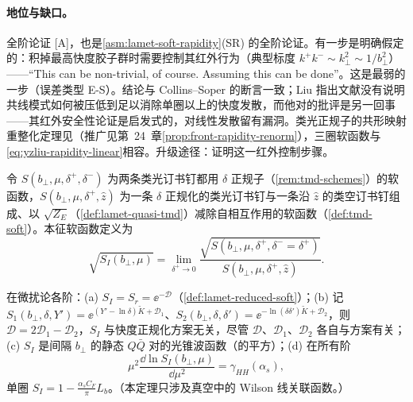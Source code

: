 \paragraph{地位与缺口。}全阶论证 [A]，也是\cref{asm:lamet-soft-rapidity}(SR) 的全阶论证。有一步是明确假定的：积掉最高快度胶子群时需要控制其红外行为（典型标度 $k^+k^-\sim k_\perp^2\sim1/b_\perp^2$）——“This can be non-trivial, of course. Assuming this can be done”\cite[附录~E]{Liu:2022nnk}。这是最弱的一步（误差类型 E-S）。结论与 Collins--Soper 的断言\cite{CollinsSoper1981}一致；Liu 指出文献\cite{Collins:2011ca}没有说明共线模式如何被压低到足以消除单圈以上的快度发散，而他对\cite{CollinsSoper1981}的批评是另一回事——其红外安全性论证是启发式的，对线性发散留有漏洞\cite[第~4.4~节、附录~D]{Liu:2022nnk}。类光正规子的共形映射重整化定理见\cite{Vladimirov:2017ksc}（推广见第~24~章\cref{prop:front-rapidity-renorm}），三圈软函数\cite{Li:2016axz}与\cref{eq:yzliu-rapidity-linear}相容。升级途径：证明这一红外控制步骤。

\begin{definition}[本征软函数的光锥定义]\label{def:yzliu-intrinsic-soft-lc}
令 $S(b_\perp,\mu,\delta^+,\delta^-)$ 为两条类光订书钉都用 $\delta$ 正规子（\cref{rem:tmd-schemes}）的软函数，$S(b_\perp,\mu,\delta^+,\hat z)$ 为一条 $\delta$ 正规化的类光订书钉与一条沿 $\hat z$ 的类空订书钉组成、以 $\sqrt{Z_E}$（\cref{def:lamet-quasi-tmd}）减除自相互作用的软函数（\cref{def:tmd-soft}）。本征软函数定义为\cite[式~(72)、(76)]{Liu:2022nnk} %
\begin{equation}\label{eq:yzliu-SI-lc}
\sqrt{S_I(b_\perp,\mu)}=\lim_{\delta^+\to0}\frac{\sqrt{S(b_\perp,\mu,\delta^+,\delta^-=\delta^+)}}{S(b_\perp,\mu,\delta^+,\hat z)} .
\end{equation}
\end{definition}

\begin{theorem}\label{thm:yzliu-intrinsic-soft}
在微扰论各阶：(a) $S_I=S_r=\ee^{-\mathcal D}$（\cref{def:lamet-reduced-soft}）；(b) 记 $S_1(b_\perp,\delta,Y')=\ee^{(Y'-\ln\delta)\tilde K+\mathcal D_1}$、$S_2(b_\perp,\delta,\delta')=\ee^{-\ln(\delta\delta')\tilde K+\mathcal D_2}$，则 $\mathcal D=2\mathcal D_1-\mathcal D_2$，$S_I$ 与快度正规化方案无关，尽管 $\mathcal D$、$\mathcal D_1$、$\mathcal D_2$ 各自与方案有关；(c) $S_I$ 是间隔 $b_\perp$ 的静态 $Q\bar Q$ 对的光锥波函数（的平方）；(d) 在所有阶
\begin{equation}\label{eq:yzliu-SI-rge}
\mu^2\frac{\dd\ln S_I(b_\perp,\mu)}{\dd\mu^2}=\gamma_{HH}(\alpha_s),
\end{equation}
单圈 $S_I=1-\frac{\alpha_sC_F}{\pi}L_b$。（本定理只涉及真空中的 Wilson 线关联函数。）%
\end{theorem}

